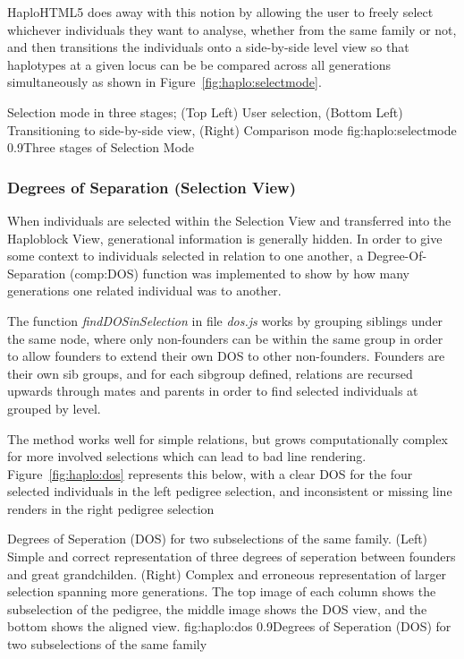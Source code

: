 HaploHTML5 does away with this notion by allowing the user to freely select whichever individuals they want to analyse, whether from the same family or not, and then transitions the individuals onto a side-by-side level view so that haplotypes at a given locus can be be compared across all generations simultaneously as shown in Figure~\ref{fig:haplo:selectmode}.

	{Selection mode in three stages; (Top Left) User selection, (Bottom Left) Transitioning to side-by-side view, (Right) Comparison mode}
	{fig:haplo:selectmode}
	{0.9}{Three stages of Selection Mode}


\subsubsection{Degrees of Separation (Selection View)}\label{ref:haplo:dos}

When individuals are selected within the Selection View and transferred into the Haploblock View, generational information is generally hidden. In order to give some context to individuals selected in relation to one another, a Degree-Of-Separation (\gls{comp:DOS}) function was implemented to show by how many generations one related individual was to another.

The function \textit{findDOSinSelection} in file \textit{dos.js} works by grouping siblings under the same node, where only non-founders can be within the same group in order to allow founders to extend their own DOS to other non-founders. Founders are their own sib groups, and for each sibgroup defined, relations are recursed upwards through mates and parents in order to find selected individuals at grouped by level.

The method works well for simple relations, but grows computationally complex for more involved selections which can lead to bad line rendering. Figure~\ref{fig:haplo:dos} represents this below, with a clear DOS for the four selected individuals in the left pedigree selection, and inconsistent or missing line renders in the right pedigree selection

	{Degrees of Seperation (DOS) for two subselections of the same family. (Left) Simple and correct representation of three degrees of seperation between founders and great grandchilden. (Right) Complex and erroneous representation of larger selection spanning more generations. The top image of each column shows the subselection of the pedigree, the middle image shows the DOS view, and the bottom shows the aligned view.}
	{fig:haplo:dos}
	{0.9}{Degrees of Seperation (DOS) for two subselections of the same family}
	
